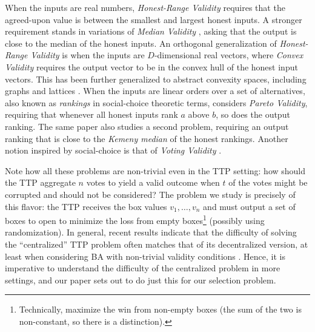 When the inputs are real numbers, \emph{Honest-Range Validity} \cite{aa_with_range_validity} requires that the agreed-upon value is between the smallest and largest honest inputs. A stronger requirement stands in variations of \emph{Median Validity} \cite{stolz,clocks,kth_element}, asking that the output is close to the median of the honest inputs. An orthogonal generalization of \emph{Honest-Range Validity} is when the inputs are $D$-dimensional real vectors, where \emph{Convex Validity} \cite{vaidya_garg_convex,convex_aa} requires the output vector to be in the convex hull of the honest input vectors. This has been further generalized to abstract convexity spaces, including graphs and lattices \cite{generalized_convexity_space_us,nowak_rybicki}. When the inputs are linear orders over a set of alternatives, also known as \emph{rankings} in social-choice theoretic terms, \cite{darya-byzantine-voting} considers \emph{Pareto Validity}, requiring that whenever all honest inputs rank $a$ above $b$, so does the output ranking. The same paper also studies a second problem, requiring an output ranking that is close to the \emph{Kemeny median} of the honest rankings. Another notion inspired by social-choice is that of \emph{Voting Validity} \cite{voting-validity}.

Note how all these problems are non-trivial even in the TTP setting: how should the TTP aggregate $n$ votes to yield a valid outcome when $t$ of the votes might be corrupted and should not be considered? The problem we study is precisely of this flavor: the TTP receives the box values $v_1, \dots, v_n$ and must output a set of boxes to open to minimize the loss from empty boxes\footnote{Technically, maximize the win from non-empty boxes (the sum of the two is non-constant, so there is a distinction).} (possibly using randomization). In general, recent results indicate that the difficulty of solving the ``centralized'' TTP problem often matches that of its decentralized version, at least when considering BA with non-trivial validity conditions \cite{pierre_civit_1,pierre_civit_2,constantinescu2024validitynetworkagnosticbyzantineagreement}. Hence, it is imperative to understand the difficulty of the centralized problem in more settings, and our paper sets out to do just this for our selection problem.

